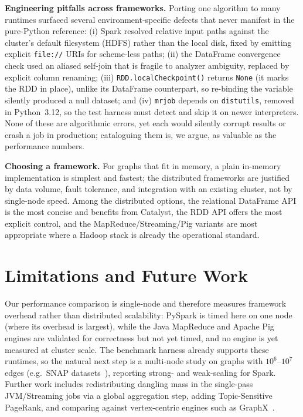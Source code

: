 \textbf{Engineering pitfalls across frameworks.} Porting one algorithm to many
runtimes surfaced several environment-specific defects that never manifest in the
pure-Python reference: (i) Spark resolved relative input paths against the
cluster's default filesystem (HDFS) rather than the local disk, fixed by
emitting explicit \texttt{file://} URIs for scheme-less paths; (ii) the
DataFrame convergence check used an aliased self-join that is fragile to analyzer
ambiguity, replaced by explicit column renaming; (iii) \texttt{RDD.localCheckpoint()}
returns \texttt{None} (it marks the RDD in place), unlike its DataFrame
counterpart, so re-binding the variable silently produced a null dataset; and
(iv) \texttt{mrjob} depends on \texttt{distutils}, removed in Python~3.12, so the
test harness must detect and skip it on newer interpreters. None of these are
algorithmic errors, yet each would silently corrupt results or crash a job in
production; cataloguing them is, we argue, as valuable as the performance
numbers.

\textbf{Choosing a framework.} For graphs that fit in memory, a plain in-memory
implementation is simplest and fastest; the distributed frameworks are justified
by data volume, fault tolerance, and integration with an existing cluster, not by
single-node speed. Among the distributed options, the relational DataFrame API is
the most concise and benefits from Catalyst, the RDD API offers the most explicit
control, and the MapReduce/Streaming/Pig variants are most appropriate where a
Hadoop stack is already the operational standard.

\section{Limitations and Future Work}
\label{sec:limits}
Our performance comparison is single-node and therefore measures framework
overhead rather than distributed scalability: PySpark is timed here on one node
(where its overhead is largest), while the Java MapReduce and Apache Pig engines
are validated for correctness but not yet timed, and no engine is yet measured at
cluster scale. The benchmark harness already supports these runtimes, so the
natural next step is a multi-node study on graphs with $10^6$--$10^7$ edges
(e.g.\ SNAP datasets~\cite{leskovec2014}), reporting strong- and weak-scaling for
Spark. Further work includes redistributing dangling mass in the single-pass
JVM/Streaming jobs via a global aggregation step, adding Topic-Sensitive
PageRank, and comparing against vertex-centric engines such as
GraphX~\cite{gonzalez2014}.

